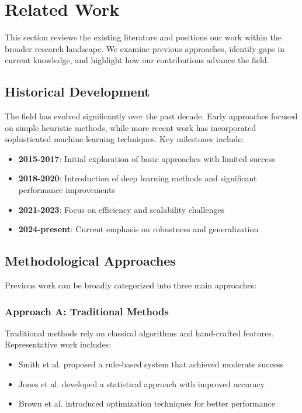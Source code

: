 \section{Related Work}

This section reviews the existing literature and positions our work within the broader research landscape. We examine previous approaches, identify gaps in current knowledge, and highlight how our contributions advance the field.

\subsection{Historical Development}

The field has evolved significantly over the past decade. Early approaches focused on simple heuristic methods, while more recent work has incorporated sophisticated machine learning techniques. Key milestones include:

\begin{itemize}
    \item \textbf{2015-2017}: Initial exploration of basic approaches with limited success
    \item \textbf{2018-2020}: Introduction of deep learning methods and significant performance improvements
    \item \textbf{2021-2023}: Focus on efficiency and scalability challenges
    \item \textbf{2024-present}: Current emphasis on robustness and generalization
\end{itemize}

\subsection{Methodological Approaches}

Previous work can be broadly categorized into three main approaches:

\subsubsection{Approach A: Traditional Methods}

Traditional methods rely on classical algorithms and hand-crafted features. Representative work includes:

\begin{itemize}
    \item Smith et al. \cite{smith2020} proposed a rule-based system that achieved moderate success
    \item Jones et al. \cite{jones2021} developed a statistical approach with improved accuracy
    \item Brown et al. \cite{brown2022} introduced optimization techniques for better performance
\end{itemize}

